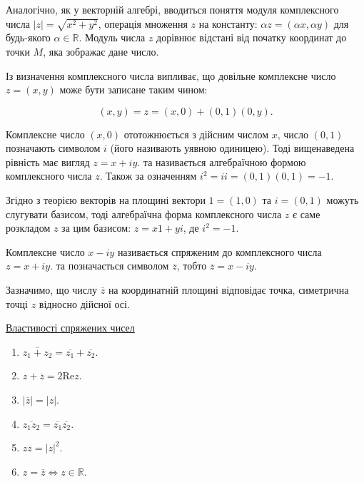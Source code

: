 Аналогічно, як у векторній алгебрі, вводиться поняття модуля комплексного
числа $|z| = \sqrt{x^2 + y^2}$, операція множення $z$ на константу: $\alpha z = (\alpha x,\alpha y)$ для
будь-якого $\alpha \in \mathbb{R}$. Модуль числа $z$ дорівнює відстані від початку координат до
точки $M$, яка зображає дане число.

Із визначення комплексного числа випливає, що довільне комплексне число
$z = (x,y)$ може бути записане таким чином:

$$(x,y) = z = (x,0) + (0,1)(0,y).$$

Комплексне число $(x,0)$ ототожнюється з дійсним числом $x$, число $(0, 1)$
позначають символом $i$ (його називають уявною одиницею). Тоді вищенаведена
рівність має вигляд $z = x + iy$. та називається алгебраїчною формою комплексного
числа $z$. Також за означенням $i^2 = ii = (0,1)(0,1) = -1$.

\parbox{3cm}{}
\parbox{9cm}{
	Згідно з теорією векторів на площині
	вектори $1=(1,0)$ та $i = (0,1)$ можуть
	слугувати базисом, тоді алгебраїчна форма
	комплексного числа $z$ є саме розкладом $z$
	за цим базисом: $z = x1 + yi$, де $i^2 = -1$.
}

\begin{definition}
	Комплексне число $x - iy$ називається спряженим до комплексного
	числа $z = x + iy$. та позначається символом $\overline{z}$, тобто $\overline{z} = x - iy$.
\end{definition}

Зазначимо, що числу $\overline{z}$ на координатній площині відповідає точка,
симетрична точці $z$ відносно дійсної осі.

\underline{Властивості спряжених чисел}

\begin{enumerate}
	\item $\overline{z_1+z_2} = \overline{z_1} + \overline{z_2}$.
	\item $z + \overline{z} = 2 \text{Re}z$.
	\item $|\overline{z}| = |z|$.
	\item $\overline{z_1z_2} = \overline{z_1}\overline{z_2}$.
	\item $z\overline{z} = |z|^2$.
	\item $z = \overline{z} \Leftrightarrow z \in \mathbb{R}$.
\end{enumerate}

